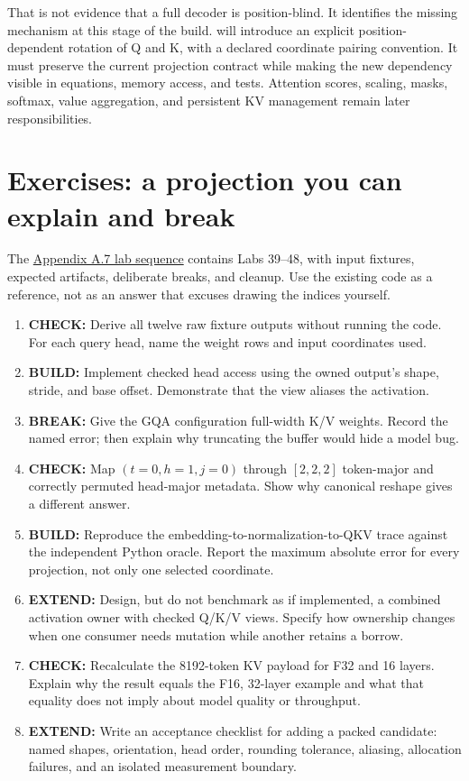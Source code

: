 That is not evidence that a full decoder is position-blind. It
identifies the missing mechanism at this stage of the build. 
will introduce an explicit position-dependent rotation of Q and K, with
a declared coordinate pairing convention. It must preserve the current
projection contract while making the new dependency visible in
equations, memory access, and tests. Attention scores, scaling, masks,
softmax, value aggregation, and persistent KV management remain later
responsibilities.

\section{Exercises: a projection you can explain and
break}\label{exercises-a-projection-you-can-explain-and-break}

The
\href{https://github.com/hermonai/inside-the-llm-engine/blob/astra-visual-rewrite/labs/lab-39-qkv-projection-workbench.md}{Appendix A.7 lab sequence} contains Labs 39--48, with input fixtures, expected
artifacts, deliberate breaks, and cleanup. Use the existing code as a
reference, not as an answer that excuses drawing the indices yourself.

\begin{enumerate}
\def\labelenumi{\arabic{enumi}.}
\tightlist
\item
  \textbf{CHECK:} Derive all twelve raw fixture outputs without running
  the code. For each query head, name the weight rows and input
  coordinates used.
\item
  \textbf{BUILD:} Implement checked head access using the owned output's
  shape, stride, and base offset. Demonstrate that the view aliases the
  activation.
\item
  \textbf{BREAK:} Give the GQA configuration full-width K/V weights.
  Record the named error; then explain why truncating the buffer would
  hide a model bug.
\item
  \textbf{CHECK:} Map \((t=0,h=1,j=0)\) through \([2,2,2]\) token-major
  and correctly permuted head-major metadata. Show why canonical reshape
  gives a different answer.
\item
  \textbf{BUILD:} Reproduce the embedding-to-normalization-to-QKV trace
  against the independent Python oracle. Report the maximum absolute
  error for every projection, not only one selected coordinate.
\item
  \textbf{EXTEND:} Design, but do not benchmark as if implemented, a
  combined activation owner with checked Q/K/V views. Specify how
  ownership changes when one consumer needs mutation while another
  retains a borrow.
\item
  \textbf{CHECK:} Recalculate the 8192-token KV payload for F32 and 16
  layers. Explain why the result equals the F16, 32-layer example and
  what that equality does not imply about model quality or throughput.
\item
  \textbf{EXTEND:} Write an acceptance checklist for adding a packed
  candidate: named shapes, orientation, head order, rounding tolerance,
  aliasing, allocation failures, and an isolated measurement boundary.
\end{enumerate}

